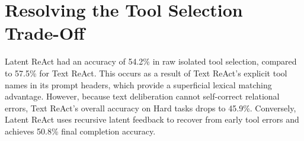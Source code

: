 \documentclass[a4paper, 12pt]{report}
\begin{document}
\section{Resolving the Tool Selection Trade-Off}
Latent ReAct had an accuracy of 54.2\% in raw isolated tool selection, compared to 57.5\% for Text ReAct. This occurs as a result of Text ReAct's explicit tool names in its prompt headers, which provide a superficial lexical matching advantage. However, because text deliberation cannot self-correct relational errors, Text ReAct's overall accuracy on Hard tasks drops to 45.9\%. Conversely, Latent ReAct uses recursive latent feedback to recover from early tool errors and achieves 50.8\% final completion accuracy.

\ifdefined\isincluded
\else
\end{document}
